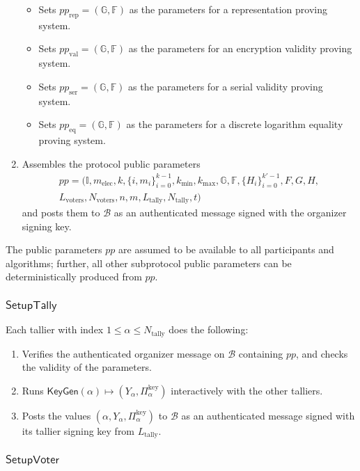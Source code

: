 \documentclass{llncs}
\newcommand{\G}{\mathbb{G}}
\newcommand{\F}{\mathbb{F}}
\newcommand{\func}[1]{\mathsf{#1}}
\begin{document}
\begin{enumerate}
\begin{itemize}
\item Sets $pp_{\text{rep}} = (\G, \F)$ as the parameters for a representation proving system.
\item Sets $pp_{\text{val}} = (\G, \F)$ as the parameters for an encryption validity proving system.
\item Sets $pp_{\text{ser}} = (\G, \F)$ as the parameters for a serial validity proving system.
\item Sets $pp_{\text{eq}} = (\G, \F)$ as the parameters for a discrete logarithm equality proving system.
\end{itemize}
\item Assembles the protocol public parameters
\begin{multline*}
    pp = (\mathbb{I}, m_{\text{elec}}, k, \{i,m_i\}_{i=0}^{k-1}, k_{\text{min}}, k_{\text{max}}, \G, \F, \{H_i\}_{i=0}^{k'-1}, F, G, H, \\
    L_{\text{voters}}, N_{\text{voters}}, n, m, L_{\text{tally}}, N_{\text{tally}}, t)
\end{multline*}
and posts them to $\mathcal{B}$ as an authenticated message signed with the organizer signing key.
\end{enumerate}

The public parameters $pp$ are assumed to be available to all participants and algorithms; further, all other subprotocol public parameters can be deterministically produced from $pp$.


\subsubsection{\texorpdfstring{$\func{SetupTally}$}{SetupTally}}

Each tallier with index $1 \leq \alpha \leq N_{\text{tally}}$ does the following:
\begin{enumerate}
\item Verifies the authenticated organizer message on $\mathcal{B}$ containing $pp$, and checks the validity of the parameters.
\item Runs $\func{KeyGen}(\alpha) \mapsto (Y_\alpha, \Pi_\alpha^{\text{key}})$ interactively with the other talliers.
\item Posts the values $(\alpha, Y_\alpha, \Pi_\alpha^{\text{key}})$ to $\mathcal{B}$ as an authenticated message signed with its tallier signing key from $L_{\text{tally}}$.
\end{enumerate}


\subsubsection{\texorpdfstring{$\func{SetupVoter}$}{SetupVoter}}
\end{document}
